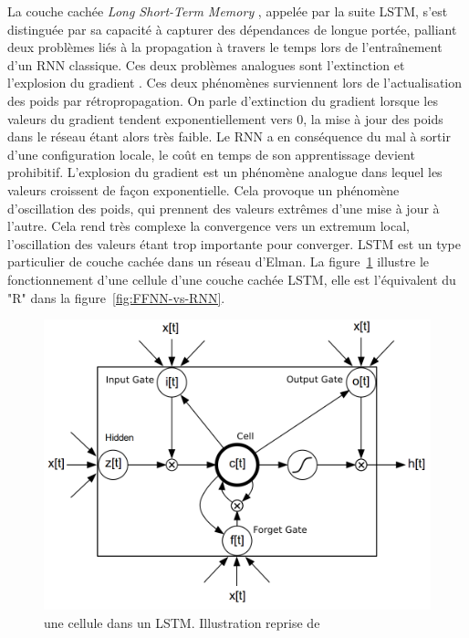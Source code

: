 \documentclass[12pt,a4paper,times,twoside,openright]{report}
\begin{document}
La couche cachée \emph{Long Short-Term Memory} \citep{hochreiter1997long}, appelée par la suite LSTM, s'est distinguée par sa capacité à capturer des dépendances de longue portée, palliant deux problèmes liés à la propagation à travers le temps lors de l'entraînement d'un RNN classique. Ces deux problèmes analogues sont l'extinction et l'explosion du gradient \citep{hochreiter1997long}. Ces deux phénomènes surviennent lors de l'actualisation des poids par rétropropagation. On parle d'extinction du gradient lorsque les valeurs du gradient tendent exponentiellement vers 0, la mise à jour des poids dans le réseau étant alors très faible. Le RNN a en conséquence du mal à sortir d'une configuration locale, le coût en temps de son apprentissage devient prohibitif. L'explosion du gradient est un phénomène analogue dans lequel les valeurs croissent de façon exponentielle. Cela provoque un phénomène d'oscillation des poids, qui prennent des valeurs extrêmes d'une mise à jour à l'autre. Cela rend très complexe la convergence vers un extremum local, l'oscillation des valeurs étant trop importante pour converger. LSTM est un type particulier de couche cachée dans un réseau d'Elman. La figure\ \ref{fig:lstm-cell} illustre le fonctionnement d'une cellule d'une couche cachée LSTM, elle est l'équivalent du "R" dans la figure\ \ref{fig:FFNN-vs-RNN}.


\begin{figure}[ht!]
\centering
\includegraphics[scale=0.75]{images/LSTM/LSTM-cell}
\caption{une cellule dans un LSTM. Illustration reprise de \citet{graves2014towards}}
\label{fig:lstm-cell}
\end{figure}
\end{document}
